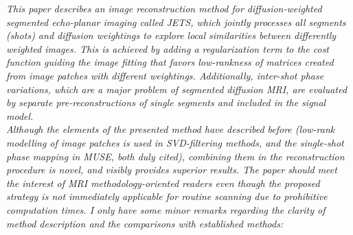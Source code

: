 \documentclass[a4paper,11pt,twoside]{report}
\begin{document}
\textit{This paper describes an image reconstruction method for diffusion-weighted segmented echo-planar imaging called JETS, which jointly processes all segments (shots) and diffusion weightings to explore local similarities between differently weighted images. This is achieved by adding a regularization term to the cost function guiding the image fitting that favors low-rankness of matrices created from image patches with different weightings. Additionally, inter-shot phase variations, which are a major problem of segmented diffusion MRI, are evaluated by separate pre-reconstructions of single segments and included in the signal model.\\
\indent Although the elements of the presented method have described before (low-rank modelling of image patches is used in SVD-filtering methods, and the single-shot phase mapping in MUSE, both duly cited), combining them in the reconstruction procedure is novel, and visibly provides superior results. The paper should meet the interest of MRI methodology-oriented readers even though the proposed strategy is not immediately applicable for routine scanning due to prohibitive computation times. I only have some minor remarks regarding the clarity of method description and the comparisons with established methods:}

\vspace{1em}
\end{document}
